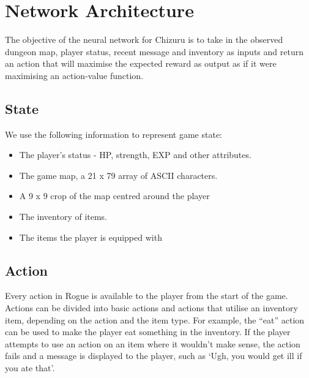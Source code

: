 \documentclass[11pt,a4paper]{article}
\begin{document}



    \section{Network Architecture}
    The objective of the neural network for Chizuru is to take in the observed dungeon map, player status, recent message and inventory as inputs and return an action that will maximise the expected reward as output as if it were maximising an action-value function.

    \subsection{State}
    We use the following information to represent game state:
    \begin{itemize}
        \item The player's status - HP, strength, EXP and other attributes.
        \item The game map, a 21 x 79 array of ASCII characters.
        \item A 9 x 9 crop of the map centred around the player
        \item The inventory of items.
        \item The items the player is equipped with
    \end{itemize}

    \subsection{Action}
    Every action in Rogue is available to the player from the start of the game.
    Actions can be divided into basic actions and actions that utilise an inventory item, depending on the action and the item type.
    For example,
    the ``eat'' action can be used to make the player eat something in the inventory.
    If the player attempts to use an action on an item where it wouldn't make sense, the action fails and a message is displayed to the player, such as `Ugh, you would get ill if you ate that'.
\end{document}
